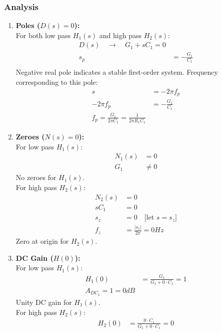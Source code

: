 \subsubsection{Analysis}
\begin{enumerate}
  \item \textbf{Poles (\(D(s) = 0\)):} \\
    For both low pass \(H_1(s)\) and high pass \(H_2(s)\):
      \begin{align*}
        D(s) \quad\rightarrow\quad G_1 + sC_1 = 0 \\
        s_p &= -\frac{G_1}{C_1} \\
      \end{align*}
    Negative real pole indicates a stable first-order system.
    Frequency corresponding to this pole:
    \begin{align*}
      s &= -2 \pi f_p \\
      -2 \pi f_p &= -\frac{G_1}{C_1} \\
      f_p = \frac{G_1}{2 \pi C_1} = \frac{1}{2 \pi R_1 C_1}
    \end{align*}
  \item \textbf{Zeroes (\(N(s) = 0\)):} \\
    For low pass $H_1(s)$:
      \begin{align*}
        N_1(s) &= 0 \\
        G_1 &\neq 0
      \end{align*}
    No zeroes for \(H_1(s)\). \\
    For high pass $H_2(s)$:
      \begin{align*}
        N_2(s) &= 0 \\
        sC_1 &= 0 \\
        s_z &= 0 \quad \text{[let \(s = s_z\)]}\\
        f_z &= \frac{|s_z|}{2\pi} = 0 Hz
      \end{align*}
    Zero at origin for \(H_2(s)\).
  \item \textbf{DC Gain (\(H(0)\)):} \\
    For low pass \(H_1(s)\):
      \begin{align*}
        H_1(0) &= \frac{G_1}{G_1 + 0 \cdot C_1} = 1 \\
        A_{DC_1} = 1 = 0 dB
      \end{align*}
    Unity DC gain for \(H_1(s)\). \\
    For high pass \(H_2(s)\):
      \begin{align*}
        H_2(0) &= \frac{0 \cdot C_1}{G_1 + 0 \cdot C_1} = 0 \\

\end{align*}
\end{enumerate}
